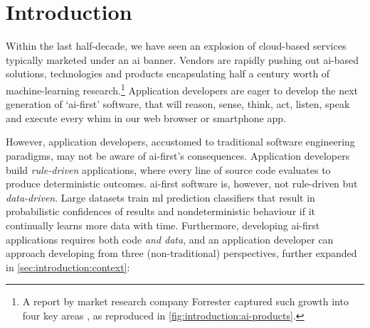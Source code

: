 \chapter{Introduction}
\label{ch:introduction}
\graphicspath{{mainmatter/introduction/figures/}}


Within the last half-decade, we have seen an explosion of cloud-based services typically marketed under an \gls{ai} banner. 
Vendors are rapidly pushing out \gls{ai}-based solutions, technologies and products encapsulating half a century worth of machine-learning research.\footnote{A \citeyear{LoGiudice:2016wf} report by market research company Forrester captured such growth into four key areas \citep{LoGiudice:2016wf}, as reproduced in  \cref{fig:introduction:ai-products}.}
Application developers are eager to develop the next generation of `\gls{ai}-first' software, that will reason, sense, think, act, listen, speak and execute every whim in our web browser or smartphone app.

However, application developers, accustomed to traditional software engineering paradigms, may not be aware of \gls{ai}-first's consequences. Application developers build \textit{rule-driven} applications, where every line of source code evaluates to produce deterministic outcomes. 
\Gls{ai}-first software is, however, not rule-driven but \textit{data-driven}. Large datasets train \gls{ml} prediction classifiers that result in probabilistic confidences of results and nondeterministic behaviour if it continually learns more data with time. Furthermore, developing \gls{ai}-first applications requires both code \textit{and data}, and an application developer can approach developing from three (non-traditional) perspectives, further expanded in \cref{sec:introduction:context}:

